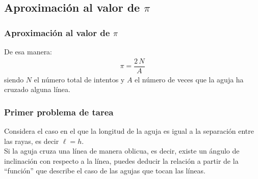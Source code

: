 \subsection{Aproximación al valor de $\pi$}
\begin{frame}
\frametitle{Aproximación al valor de $\pi$}
De esa manera: 
\begin{align*}
\pi = \dfrac {2 \, N}{A}
\end{align*}
siendo $N$ el número total de intentos y $A$ el número de veces que la aguja ha cruzado alguna línea.
\end{frame}
\begin{frame}
\frametitle{Primer problema de tarea}
Considera el caso en el que la longitud de la aguja es igual a la separación entre las rayas, es decir $\ell = h$.
\\
\bigskip
Si la aguja cruza una línea de manera oblicua, es decir, existe un ángulo de inclinación con respecto a la línea, puedes deducir la relación a partir de la \enquote{función} que describe el caso de las agujas que tocan las líneas.
\end{frame}

